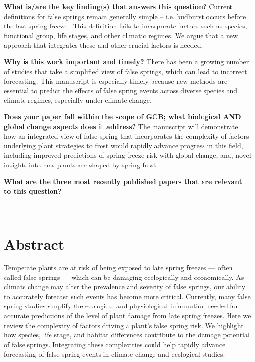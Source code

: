 \documentclass{article}\usepackage[]{graphicx}\usepackage[]{color}
\begin{document}
\textbf{What is/are the key finding(s) that answers this question?} 
Current definitions for false springs remain generally simple -- i.e. budburst occurs before the last spring freeze \citep{Gu2008}. This definition fails to incorporate factors such as species, functional group, life stages, and other climatic regimes. We argue that a new approach that integrates these and other crucial factors is needed. 

\textbf{Why is this work important and timely?}
There has been a growing number of studies that take a simplified view of false springs, which can lead to incorrect forecasting. This manuscript is especially timely because new methods are essential to predict the effects of false spring events across diverse species and climate regimes, especially under climate change. 

\textbf{ Does your paper fall within the scope of GCB; what biological AND global change aspects does it address?}
The manuscript will demonstrate how an integrated view of false spring that incorporates the complexity of factors underlying plant strategies to frost would rapidly advance progress in this field, including improved predictions of spring freeze risk with global change, and, novel insights into how plants are shaped by spring frost. 

\textbf{What are the three most recently published papers that are relevant to this question?} 
\\
\\
\\

\newpage

\section*{Abstract}
Temperate plants are at risk of being exposed to late spring freezes --- often called false springs --- which can be damaging ecologically and economically. As climate change may alter the prevalence and severity of false springs, our ability to accurately forecast such events has become more critical. Currently, many false spring studies simplify the ecological and physiological information needed for accurate predictions of the level of plant damage from late spring freezes. Here we review the complexity of factors driving a plant's false spring risk. We highlight how species, life stage, and habitat differences contribute to the damage potential of false springs. %
Integrating these complexities could help rapidly advance forecasting of false spring events in climate change and ecological studies.
\end{document}
